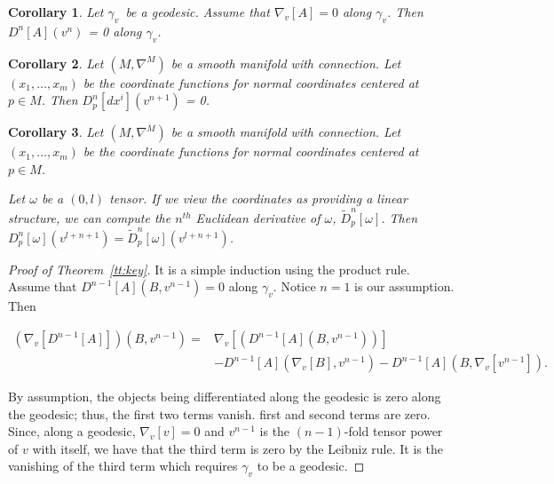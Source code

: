 \documentclass[11pt]{article}
\newtheorem{cor}{Corollary}
\theoremstyle{remark}
\begin{document}
\begin{cor}\label{tc:da}
Let \ensuremath{\gamma_v}\ be a geodesic. Assume that $\ensuremath{{{\nabla}}_{v}^{}{[A]}}=
0$ along
\ensuremath{\gamma_v}. Then \ensuremath{D^{n} [{A}] ({ v^n}) } = 0  along \ensuremath{\gamma_v}.   
\end{cor}

\begin{cor}\label{tc:geo}
Let $(M,\nabla^{M})$ be a smooth manifold with connection. Let 
$(x_1,
\dots, x_m)$ be the coordinate functions for 
 normal coordinates centered at $p \in M$. Then
\ensuremath{D_{p}^{n} {[dx^i]} ({v^{n+1}}) } = 0.
\end{cor}

\begin{cor}\label{tc:imp}
Let $(M,\nabla^M)$ be a smooth manifold with connection.  Let 
$(x_1,
\dots, x_m)$ be the coordinate functions for 
 normal coordinates centered at $p \in M$. 


Let
$\omega$ be a $(0,l)$ tensor. If we view the coordinates as providing a
linear structure, we can compute the $\ensuremath{{n}^{th}}$ 
Euclidean derivative of $\omega$, $\tilde{D}^n_{p}[\omega]$.
Then
$\ensuremath{D_{p}^{n} {[\omega]} ({v^{l+n+1}}) } = \tilde{D}^n_{p}[\omega](v^{l+n+1})$.
\end{cor}

\begin{proof}[Proof of Theorem~\ref{tt:key}]
It is a simple induction using the product rule. Assume that
$\ensuremath{D^{n-1} [{A}] ({B, v^{n-1}}) } = 0$ along \ensuremath{\gamma_v}. Notice $n=1$
is our assumption. Then 


\begin{align*}
(\ensuremath{{{\nabla}}_{v}^{}{[\ensuremath{D^{n-1} [{A}] {} }]}})(B, v^{n-1})  =&
\ensuremath{{{\nabla}}_{v}^{}{[(\ensuremath{D^{n-1} [{A}] {(B, v^{n-1})} })]}} \\ 
&- \ensuremath{D^{n-1} [{A}] ({\ensuremath{{{\nabla}}_{v}^{}{[B]}}, v^{n-1}}) }
- \ensuremath{D^{n-1} [{A}] {(B, \ensuremath{{{\nabla}}_{v}^{}{[v^{n-1}]}})} }.
\end{align*}


By assumption, the objects being differentiated along the geodesic is 
zero along the geodesic; thus, the first two terms vanish. 
first and second terms are zero. Since, along a geodesic,
$\ensuremath{{{\nabla}}_{v}^{}{[v]}} = 0$ and $v^{n-1}$ is the $(n-1)$-fold tensor power of
$v$ with itself, 
we have that the third term is zero by the Leibniz rule. It is the
vanishing of the third term which requires $\ensuremath{\gamma_v}$ to be a geodesic.
\end{proof}
\end{document}
